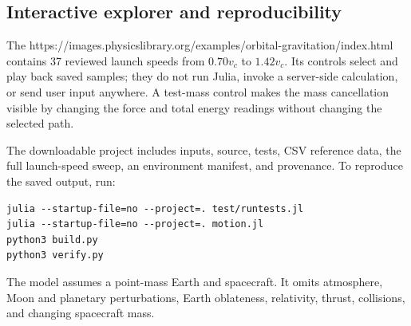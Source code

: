 \subsection{Interactive explorer and reproducibility}

The 
{https://images.physicslibrary.org/examples/orbital-gravitation/index.html}
contains 37 reviewed launch speeds from $0.70v_c$ to $1.42v_c$.  Its controls
select and play back saved samples; they do not run Julia, invoke a server-side
calculation, or send user input anywhere.  A test-mass control makes the
mass cancellation visible by changing the force and total energy readings
without changing the selected path.

The downloadable project includes inputs, source, tests, CSV reference data,
the full launch-speed sweep, an environment manifest, and provenance.  To
reproduce the saved output, run:
\begin{verbatim}
julia --startup-file=no --project=. test/runtests.jl
julia --startup-file=no --project=. motion.jl
python3 build.py
python3 verify.py
\end{verbatim}
The model assumes a point-mass Earth and spacecraft.  It omits atmosphere,
Moon and planetary perturbations, Earth oblateness, relativity, thrust,
collisions, and changing spacecraft mass.
